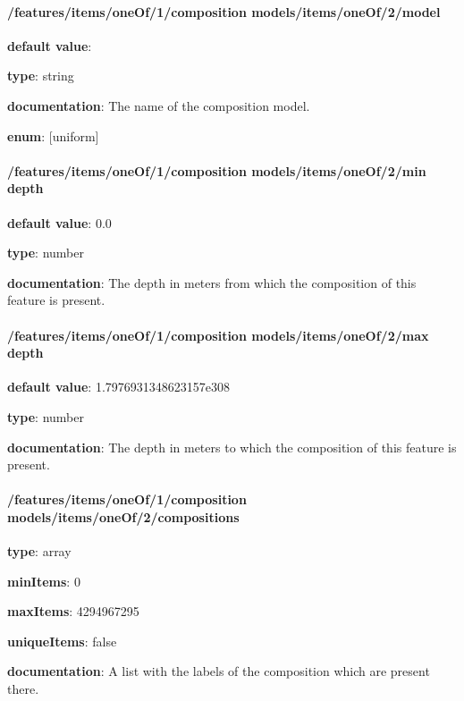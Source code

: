 \paragraph{/features/items/oneOf/1/composition models/items/oneOf/2/model} \begin{itemized}
\item {\bf default value}: 
\item {\bf type}: string
\item {\bf documentation}: The name of the composition model.
\item {\bf enum}: [uniform]\end{itemized}\paragraph{/features/items/oneOf/1/composition models/items/oneOf/2/min depth} \begin{itemized}
\item {\bf default value}: 0.0
\item {\bf type}: number
\item {\bf documentation}: The depth in meters from which the composition of this feature is present.
\end{itemized}\paragraph{/features/items/oneOf/1/composition models/items/oneOf/2/max depth} \begin{itemized}
\item {\bf default value}: 1.7976931348623157e308
\item {\bf type}: number
\item {\bf documentation}: The depth in meters to which the composition of this feature is present.
\end{itemized}\paragraph{/features/items/oneOf/1/composition models/items/oneOf/2/compositions} \begin{itemized}
\item {\bf type}: array
\item {\bf minItems}: 0
\item {\bf maxItems}: 4294967295
\item {\bf uniqueItems}: false
\item {\bf documentation}: A list with the labels of the composition which are present there.

\end{itemized}
